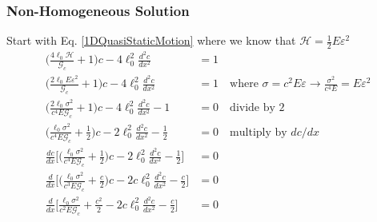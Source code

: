 \documentclass[12pt,3p]{article}
\numberwithin{equation}{section}
\begin{document}
\subsubsection{Non-Homogeneous Solution}
Start with Eq. \ref{1DQuasiStaticMotion} where we know that $\mathcal{H} = \frac{1}{2} E \varepsilon^2$
\begin{align*}
\bigg(\frac{4 \ell_0 \mathcal{H}}{\mathcal{G}_c} + 1 \bigg) c - 4 \ell_0^2 \frac{d^2 c }{d x^2} &= 1 \\
\bigg(\frac{2 \ell_0 E \varepsilon^2}{\mathcal{G}_c} + 1 \bigg) c - 4 \ell_0^2 \frac{d^2 c }{d x^2} &= 1 \quad \text{where } \sigma = c^2 E \varepsilon \rightarrow \frac{\sigma^2}{c^4 E} = E \varepsilon^2 \\
\bigg(\frac{2 \ell_0 \sigma^2}{c^4 E \mathcal{G}_c} + 1 \bigg) c - 4 \ell_0^2 \frac{d^2 c }{d x^2} -1 &= 0 \quad \text{divide by 2} \\
\bigg(\frac{\ell_0 \sigma^2}{c^4 E \mathcal{G}_c} + \frac{1}{2} \bigg) c - 2 \ell_0^2 \frac{d^2 c }{d x^2} - \frac{1}{2} &= 0 \quad \text{multiply by } dc/dx \\
\frac{dc}{dx} \bigg[ \bigg(\frac{\ell_0 \sigma^2}{c^4 E \mathcal{G}_c} + \frac{1}{2} \bigg) c - 2 \ell_0^2 \frac{d^2 c }{d x^2} - \frac{1}{2} \bigg] &= 0 \\
\frac{d}{dx} \bigg[ \bigg(\frac{\ell_0 \sigma^2}{c^3 E \mathcal{G}_c} + \frac{c}{2} \bigg) c - 2 c \ell_0^2 \frac{d^2 c }{d x^2} - \frac{c}{2} \bigg] &= 0 \\
\frac{d}{dx} \bigg[ \frac{\ell_0 \sigma^2}{c^2 E \mathcal{G}_c} + \frac{c^2}{2}- 2 c \ell_0^2 \frac{d^2 c }{d x^2} - \frac{c}{2} \bigg] &= 0 \\
\end{align*}

\end{document}
